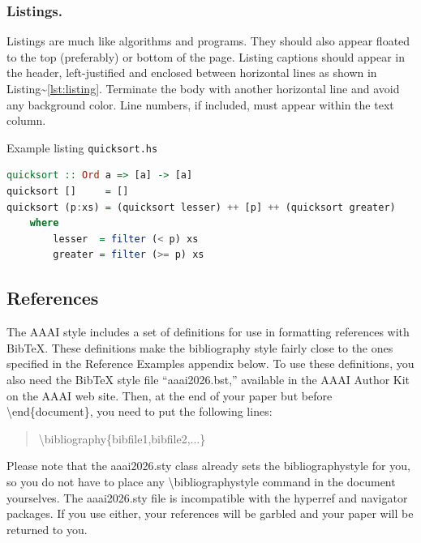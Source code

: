 \subsubsection{Listings.}

Listings are much like algorithms and programs. They should also appear
floated to the top (preferably) or bottom of the page. Listing captions
should appear in the header, left-justified and enclosed between
horizontal lines as shown in Listing\textasciitilde{}\ref{lst:listing}.
Terminate the body with another horizontal line and avoid any background
color. Line numbers, if included, must appear within the text column.

\begin{listing}[tb]%
\caption{Example listing {\tt quicksort.hs}}%
\label{lst:listing}%
\begin{lstlisting}[language=Haskell]
quicksort :: Ord a => [a] -> [a]
quicksort []     = []
quicksort (p:xs) = (quicksort lesser) ++ [p] ++ (quicksort greater)
    where
        lesser  = filter (< p) xs
        greater = filter (>= p) xs
\end{lstlisting}
\end{listing}

\subsection{References}

The AAAI style includes a set of definitions for use in formatting
references with BibTeX. These definitions make the bibliography style
fairly close to the ones specified in the Reference Examples appendix
below. To use these definitions, you also need the BibTeX style file
``aaai2026.bst,'' available in the AAAI Author Kit on the AAAI web site.
Then, at the end of your paper but before
\textbackslash end\{document\}, you need to put the following lines:

\begin{quote}
\begin{small}
\textbackslash bibliography\{bibfile1,bibfile2,...\}
\end{small}
\end{quote}

Please note that the aaai2026.sty class already sets the
bibliographystyle for you, so you do not have to place any
\textbackslash bibliographystyle command in the document yourselves. The
aaai2026.sty file is incompatible with the hyperref and navigator
packages. If you use either, your references will be garbled and your
paper will be returned to you.

